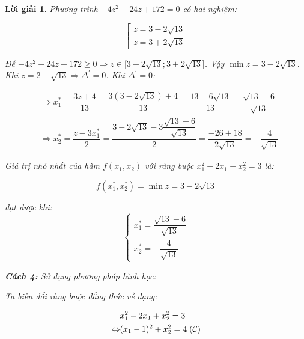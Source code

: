\documentclass[14pt, a4paper]{article}
\theoremstyle{sltheorem}
\theoremstyle{soltheorem}
\newtheorem*{loigiai}{Lời giải}
\begin{document}
\begin{loigiai}
        Phương trình $-4 z^2 + 24z + 172 = 0$ có hai nghiệm:

        \begin{equation*}
            \left [\begin{array}{l} z = 3 - 2 \sqrt{13} \\ z = 3 + 2 \sqrt{13} \end{array} \right.
        \end{equation*}

        Để $-4 z^2 + 24z + 172 \geq 0 \Rightarrow z \in \lbrack 3 - 2\sqrt{13}; 3 + 2 \sqrt{13} \rbrack$.
        Vậy $\min z = 3 - 2 \sqrt{13}$. Khi $z = 2 - \sqrt{13} \Rightarrow \Delta^{\prime} = 0$.
        Khi $\Delta^{\prime}=0$:

        \begin{equation*}
            \begin{aligned}
                &\Rightarrow x_1^* = \dfrac{3z + 4}{13}=\dfrac{3 (3 - 2\sqrt{13}) + 4}{13}=\dfrac{13 - 6\sqrt{13}}{13}=\dfrac{\sqrt{13} - 6}{\sqrt{13}} \\
                &\Rightarrow x_2^* = \dfrac{z - 3x_1^*}{2}=\dfrac{3 - 2\sqrt{13} - 3 \dfrac{\sqrt{13} - 6}{\sqrt{13}}}{2}=\dfrac{-26 + 18}{2\sqrt{13}}=-\dfrac{4}{\sqrt{13}}
            \end{aligned}
        \end{equation*}

        Giá trị nhỏ nhất của hàm $f(x_1, x_2)$ với ràng buộc $x_1^2 - 2x_1 + x_2^2 = 3$ là:

        \begin{equation*}
            f(x_1^*, x_2^*) = \min z = 3 - 2\sqrt{13}
        \end{equation*}

        đạt được khi:
        \begin{equation*}
            \begin{cases} 
                x_1^* = \dfrac{\sqrt{13} - 6}{\sqrt{13}} \\ 
                x_2^* = - \dfrac{4}{\sqrt{13}} 
            \end{cases}
        \end{equation*}

        \textbf{Cách 4:} Sử dụng phương pháp hình học:

        Ta biến đổi ràng buộc đẳng thức về dạng:

        \begin{equation*}
            \begin{aligned}
            &x_1^2 - 2x_1 + x_2^2 = 3 \\
            \Leftrightarrow & (x_1 - 1)^2 + x_2^2 = 4 \thickspace (\mathcal{C})
            \end{aligned}
        \end{equation*}


\end{loigiai}
\end{document}
